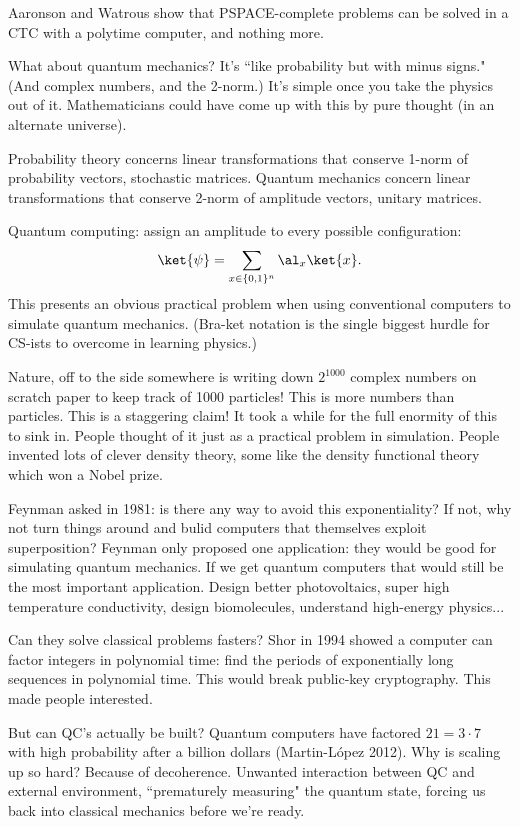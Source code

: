 \begin{enumerate}
Aaronson and Watrous show that PSPACE-complete problems can be solved in a CTC with a polytime computer, and nothing more. 
\end{enumerate}

What about quantum mechanics? It's ``like probability but with minus signs." (And complex numbers, and the 2-norm.)
It's simple once you take the physics out of it. 
Mathematicians could have come up with this by pure thought (in an alternate universe).

Probability theory concerns linear transformations that conserve 1-norm of probability vectors, stochastic matrices. Quantum mechanics concern linear transformations that conserve 2-norm of amplitude vectors, unitary matrices.

Quantum computing: assign an amplitude to every possible configuration:
\[
\ket{\psi}=\sum_{x\in \{0,1\}^n}\al_x\ket{x}.
\]
This presents an obvious practical problem when using conventional computers to simulate quantum mechanics. (Bra-ket notation is the single biggest hurdle for CS-ists to overcome in learning physics.)

Nature, off to the side somewhere is writing down $2^{1000}$ complex numbers on scratch paper to keep track of 1000 particles! This is more numbers than particles. This is a staggering claim! It took a while for the full enormity of this to sink in. People thought of it just as a practical problem in simulation. People invented lots of clever density theory, some like the density functional theory which won a Nobel prize.

Feynman asked in 1981: is there any way to avoid this exponentiality? If not, why not turn things around and bulid computers that themselves exploit superposition? Feynman only proposed one application: they would be good for simulating quantum mechanics. If we get quantum computers that would still be the most important application. Design better photovoltaics, super high temperature conductivity, design biomolecules, understand high-energy physics...

Can they solve classical problems fasters? Shor in 1994 showed a computer can factor integers in polynomial time: find the periods of exponentially long sequences in polynomial time. This would break public-key cryptography. This made people interested.

But can QC's actually be built? Quantum computers have factored $21=3\cdot 7$ with high probability after a billion dollars (Martin-L\'opez 2012).
Why is scaling up so hard? Because of decoherence. Unwanted interaction between QC and external environment, ``prematurely measuring" the quantum state, forcing us back into classical mechanics before we're ready.

